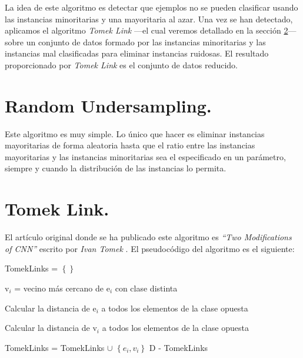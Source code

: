 La idea de este algoritmo es detectar que ejemplos no se pueden clasificar usando las instancias minoritarias y una mayoritaria al azar. Una vez se han detectado, aplicamos el algoritmo \textit{Tomek Link} —el cual veremos detallado en la sección \ref{sec:alg_tl}— sobre un conjunto de datos formado por las instancias minoritarias y las instancias mal clasificadas para eliminar instancias ruidosas. El resultado proporcionado por \textit{Tomek Link} es el conjunto de datos reducido.

\section{Random Undersampling.} \label{sec:alg_ru}

Este algoritmo es muy simple. Lo único que hacer es eliminar instancias mayoritarias de forma aleatoria hasta que el ratio entre las instancias mayoritarias y las instancias minoritarias sea el especificado en un parámetro, siempre y cuando la distribución de las instancias lo permita.

\section{Tomek Link.} \label{sec:alg_tl}
El artículo original donde se ha publicado este algoritmo es \textit{``Two Modifications of CNN''} escrito por \textit{Ivan Tomek} \cite{tl}. El pseudocódigo del algoritmo es el siguiente:

\begin{codigo}
\begin{algorithmic}[1]
\State TomekLinks = $\left \{ \right\}$
\State \parbox[t]{305pt}{v$_i$ = vecino más cercano de e$_i$ con clase distinta\strut}
\State \parbox[t]{305pt}{Calcular la distancia de e$_i$ a todos los elementos de la clase opuesta\strut}
\end{algorithmic}
\end{codigo}
	
\begin{codigo}
\begin{algorithmic}[1]
\State \parbox[t]{305pt}{Calcular la distancia de v$_i$ a todos los elementos de la clase opuesta\strut}
\State TomekLinks = TomekLinks $\cup$ $\left \{ e_i, v_i \right\}$
\EndIf
\EndFor
\State \Return D - TomekLinks
\EndFunction 
\end{algorithmic}
\end{codigo}

